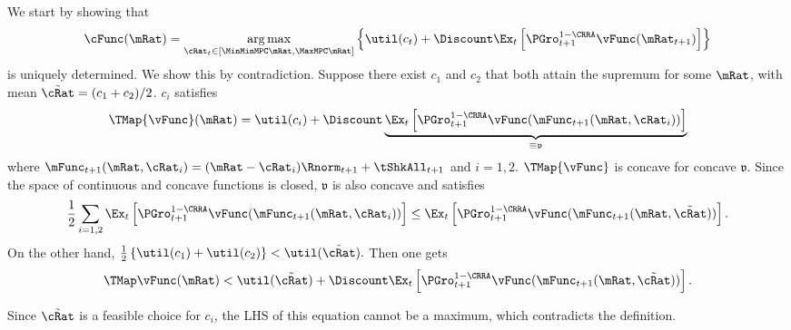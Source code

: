 \documentclass[titlepage]{\econtex}\providecommand{\texname}{BufferStockTheory}%
\begin{document}
We start by showing that
\begin{equation}
\cFunc(\mRat)=\underset{\cRat_{t}\in [\MinMinMPC \mRat,\MaxMPC \mRat]}{\arg \max }\left\{
\util(c_{t})+\Discount \Ex_{t}\left[ {\PGro}_{t+1}^{1-\CRRA }\vFunc( {\mRat}_{t+1}) \right] \right\}
\end{equation}
is uniquely determined. We show this by contradiction. Suppose there
exist $c_{1}$ and $c_{2}$ that both attain the supremum for some $\mRat$,
with mean $\tilde{\cRat}=(c_{1}+c_{2})/2$. $c_{i}$ satisfies
\begin{equation}
\TMap{\vFunc}(\mRat)=\util(c_{i})+\Discount \underbrace{\Ex_{t}\left[ {\PGro}_{t+1}
^{1-\CRRA }\vFunc(\mFunc_{t+1}( \mRat,\cRat_{i}) )
\right]}_{\equiv \mathfrak{v}}
\end{equation}
where $\mFunc_{t+1}(\mRat,\cRat_{i}) =(\mRat-\cRat_{i})\Rnorm_{t+1}+\tShkAll_{t+1}$ and
$i=1,2$. $\TMap{\vFunc}$ is concave for concave $\mathfrak{v}$. Since the space of
continuous and concave functions is closed, $\mathfrak{v}$ is also
concave and satisfies
\begin{equation}
\frac{1}{2}\sum_{i=1,2}\Ex_{t}\left[ {\PGro}_{t+1}^{1-\CRRA
}\vFunc( \mFunc_{t+1}( \mRat,\cRat_{i}) ) \right] \leq
\Ex_{t}\left[ {\PGro}_{t+1}^{1-\CRRA }\vFunc( \mFunc_{t+1}( \mRat,\tilde{\cRat}) ) \right].
\end{equation}
On the other hand, $\frac{1}{2}\left\{ \util(c_{1})+\util(c_{2})\right\} <\util(
\tilde{\cRat}).$ Then one gets
\begin{equation}
\TMap \vFunc(\mRat)<\util(\tilde{\cRat})+\Discount \Ex_{t}\left[ {\PGro}_{t+1}^{1-\CRRA
}\vFunc( \mFunc_{t+1}( \mRat,\tilde{\cRat}) ) \right].
\end{equation}

Since $\tilde{\cRat}$ is a feasible choice for $c_{i}$, the
LHS of this equation cannot be a maximum,  which contradicts the definition.
\end{document}
